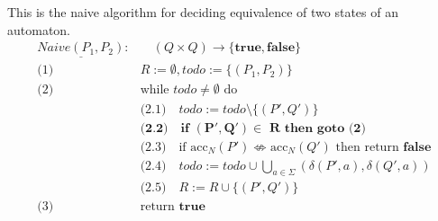 \begin{definition}
  This is the naive algorithm for deciding equivalence of two states of an automaton.
  \begin{align*}
    \underline{\mathit{Naive(P_1, P_2)}}: &\quad (Q \times Q) \to \{\mathbf{true}, \mathbf{false}\} \\
    \text{(1) } & R := \emptyset, \mathit{todo} := \{(P_1, P_2)\} \\
    \text{(2) } & \text{while } \mathit{todo} \neq \emptyset \text{ do}\\
      & \text{(2.1)}\quad \mathit{todo} := \mathit{todo} \setminus \{(P', Q')\}\\
      & \textbf{(2.2)}\quad \textbf{if } \mathbf{(P', Q') \in} \textbf{ R} \textbf{ then goto (2)}\\
      & \text{(2.3)}\quad \text{if } \text{acc}_N(P') \nLeftrightarrow \text{acc}_N(Q') \text{ then return } \mathbf{false}\\
      & \text{(2.4)}\quad \mathit{todo} := \mathit{todo} \cup \bigcup_{a \in \Sigma}{(\delta(P', a), \delta(Q', a))}\\
      & \text{(2.5)}\quad R := R \cup \{(P', Q')\} \\
    \text{(3) } & \text{return } \mathbf{true}\\
  \end{align*}
\end{definition}
